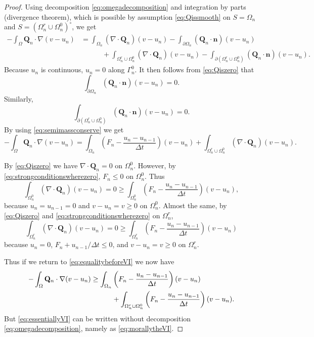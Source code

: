 \documentclass[final,leqno,onefignum,onetabnum]{siamltex1213bueler}
\newcommand\bn{\mathbf{n}}
\newcommand\bQ{\mathbf{Q}}
\newcommand{\Div}{\nabla\cdot}
\renewcommand{\grad}{\nabla}
\begin{document}
\begin{proof}
Using decomposition \eqref{eq:omegadecomposition} and integration by parts (divergence theorem), which is possible by assumption \eqref{eq:Qissmooth} on $S=\Omega_n$ and $S=(\Omega_n^r \cup \Omega_n^0)^\circ$, we get
\begin{align*}
-\int_{\Omega} \bQ_n \cdot \grad(v-u_n) &= \int_{\Omega_n} (\Div \bQ_n) (v-u_n) - \int_{\partial \Omega_n} (\bQ_n \cdot \bn) (v-u_n) \\
  &\qquad\quad + \int_{\Omega_n^r \cup \Omega_n^0} (\Div \bQ_n) (v-u_n) - \int_{\partial(\Omega_n^r \cup \Omega_n^0)} (\bQ_n \cdot \bn) (v-u_n).
\end{align*}
Because $u_n$ is continuous, $u_n=0$ along $\Gamma_n^0$.  It then follows from \eqref{eq:Qiszero} that
       $$\int_{\partial \Omega_n} (\bQ_n \cdot \bn) (v-u_n) = 0.$$
Similarly,
       $$\int_{\partial(\Omega_n^r \cup \Omega_n^0)} (\bQ_n \cdot \bn) (v-u_n) = 0.$$
By using \eqref{eq:semimassconserve} we get
\begin{equation}
-\int_{\Omega} \bQ_n \cdot \grad(v-u_n) = \int_{\Omega_n} \left(F_n - \frac{u_n - u_{n-1}}{\Delta t}\right) (v-u_n) + \int_{\Omega_n^r \cup \Omega_n^0} (\Div \bQ_n) (v-u_n). \label{eq:equalitybeforeVI}
\end{equation}

By \eqref{eq:Qiszero} we have $\Div \bQ_n=0$ on $\Omega_n^0$.  However, by \eqref{eq:strongconditionswherezero}, $F_n \le 0$ on $\Omega_n^0$.  Thus
    $$\int_{\Omega_n^0} (\Div \bQ_n) (v-u_n) = 0 \ge \int_{\Omega_n^0} \left(F_n - \frac{u_n - u_{n-1}}{\Delta t}\right) (v-u_n),$$
because $u_n=u_{n-1}=0$ and $v-u_n = v \ge 0$ on $\Omega_n^0$.  Almost the same, by \eqref{eq:Qiszero} and \eqref{eq:strongconditionswherezero} on $\Omega_n^r$,
    $$\int_{\Omega_n^r} (\Div \bQ_n) (v-u_n) = 0 \ge \int_{\Omega_n^r} \left(F_n - \frac{u_n - u_{n-1}}{\Delta t}\right) (v-u_n)$$
because $u_n=0$, $F_n + u_{n-1}/\Delta t \le 0$, and $v-u_n = v \ge 0$ on $\Omega_n^r$.  

Thus if we return to \eqref{eq:equalitybeforeVI} we now have
\begin{align}
-\int_{\Omega} \bQ_n \cdot \grad(v-u_n) &\ge \int_{\Omega_n} \left(F_n - \frac{u_n - u_{n-1}}{\Delta t}\right) (v-u_n) \label{eq:essentiallyVI} \\
  &\qquad\quad + \int_{\Omega_n^r \cup \Omega_n^0} \left(F_n - \frac{u_n - u_{n-1}}{\Delta t}\right) (v-u_n). \notag
\end{align}
But \eqref{eq:essentiallyVI} can be written without decomposition \eqref{eq:omegadecomposition}, namely as \eqref{eq:morallytheVI}.
\end{proof}
\end{document}
